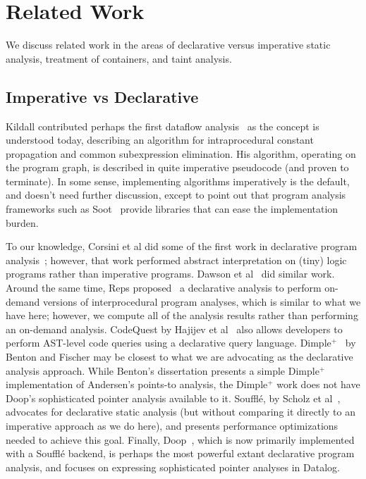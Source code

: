 \chapter{Related Work}
\label{chap:related}

We discuss related work in the areas of declarative versus imperative static analysis, treatment of containers, and taint analysis.

\section{Imperative vs Declarative}

Kildall contributed perhaps the first dataflow analysis~\cite{kildall73:_unified_approac_global_progr_optim} as the concept is understood today, describing an algorithm for intraprocedural constant propagation and common subexpression elimination. His algorithm, operating on the program graph, is described in quite imperative pseudocode (and proven to terminate). In some sense, implementing algorithms imperatively is the default, and doesn't need further discussion, except to point out that program analysis frameworks such as Soot~\cite{Vallee-Rai:1999:SJB:781995.782008} provide libraries that can ease the implementation burden.

To our knowledge, Corsini et al did some of the first work in declarative program analysis~\cite{corsini93:_effic}; however, that work performed abstract interpretation on (tiny) logic programs rather than imperative programs. Dawson et al~\cite{dawson96:_pract_progr_analy_using_gener} did similar work. Around the same time, Reps proposed~\cite{Reps1995} a declarative analysis to perform on-demand versions of interprocedural program analyses, which is similar to what we have here; however, we compute all of the analysis results rather than performing an on-demand analysis. CodeQuest by Hajijev et al~\cite{hajiyev06} also allows developers to perform AST-level code queries using a declarative query language. {\sc Dimple$^+$}~\cite{benton07:_inter_scalab_declar_progr_analy}\cite[Chapter 3]{benton08:_fast_effec_progr_analy_objec_level_paral} by Benton and Fischer may be closest to what we are advocating as the declarative analysis approach. While Benton's dissertation presents a simple {\sc Dimple$^+$} implementation of Andersen's points-to analysis, the {\sc Dimple$^+$} work does not have Doop's sophisticated pointer analysis available to it. Soufflé, by Scholz et al~\cite{scholz16:_fast_large_scale_progr_analy_datal}, advocates for declarative static analysis (but without comparing it directly to an imperative approach as we do here), and presents performance optimizations needed to achieve this goal.
Finally, Doop~\cite{bravenboer09:_stric_declar_specif_sophis_point_analy}, which is now primarily implemented with a Soufflé backend, is perhaps the most powerful extant declarative program analysis, and focuses on expressing sophisticated pointer analyses in Datalog. 



